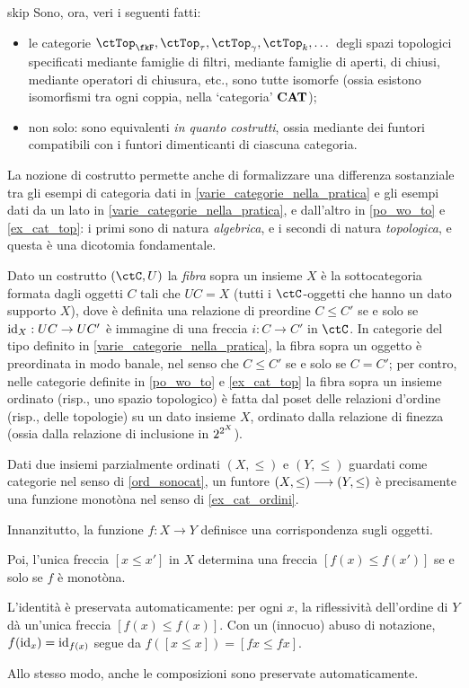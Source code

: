 \begin{hDigression}{skip}
	Sono, ora, veri i seguenti fatti:
	\begin{itemize}
		\item le categorie \(\ctTop_\fkF,\ctTop_\tau,\ctTop_\gamma,\ctTop_k,\dots\) degli spazi topologici specificati mediante famiglie di filtri, mediante famiglie di aperti, di chiusi, mediante operatori di chiusura, etc., sono tutte isomorfe (ossia esistono isomorfismi tra ogni coppia, nella `categoria' \(\mathbf{CAT}\));
		\item non solo: sono equivalenti \emph{in quanto costrutti}, ossia mediante dei funtori compatibili con i funtori dimenticanti di ciascuna categoria.
	\end{itemize}
	La nozione di costrutto permette anche di formalizzare una differenza sostanziale tra gli esempi di categoria dati in \ref{varie_categorie_nella_pratica} e gli esempi dati da un lato in \ref{varie_categorie_nella_pratica}, e dall'altro in \ref{po_wo_to} e \ref{ex_cat_top}: i primi sono di natura \emph{algebrica}, e i secondi di natura \emph{topologica}, e questa è una dicotomia fondamentale.

	Dato un costrutto \((\ctC,U)\) la \emph{fibra} sopra un insieme \(X\) è la sottocategoria formata dagli oggetti \(C\) tali che \(UC=X\) (tutti i \(\ctC\)-oggetti che hanno un dato supporto \(X\)), dove è definita una relazione di preordine \(C\le C'\) se e solo se \(\mathrm{id}_X : UC \to UC'\) è immagine di una freccia \(i : C\to C'\) in \(\ctC\). In categorie del tipo definito in \ref{varie_categorie_nella_pratica}, la fibra sopra un oggetto è preordinata in modo banale, nel senso che \(C\le C'\) se e solo se \(C=C'\); per contro, nelle categorie definite in \ref{po_wo_to} e \ref{ex_cat_top} la fibra sopra un insieme ordinato (risp., uno spazio topologico) è fatta dal poset delle relazioni d'ordine (risp., delle topologie) su un dato insieme \(X\), ordinato dalla relazione di finezza (ossia dalla relazione di inclusione in \(2^{2^{X}}\)).
\end{hDigression}
\begin{example}\label{exa_monotone_funtori}
	Dati due insiemi parzialmente ordinati \((X,\le)\) e \((Y,\le)\) guardati come categorie nel senso di \ref{ord_sonocat}, un funtore \((X,\le)\longrightarrow(Y,\le)\) è precisamente una funzione monotòna nel senso di \ref{ex_cat_ordini}.

	Innanzitutto, la funzione \(f:X\to Y\) definisce una corrispondenza sugli oggetti.

	Poi, l'unica freccia \([x\le x']\) in \(X\) determina una freccia \([f(x)\le f(x')]\) se e solo se \(f\) è monotòna.

	L'identità è preservata automaticamente: per ogni \(x\), la riflessività dell'ordine di \(Y\) dà un'unica freccia \([f(x)\le f(x)]\). Con un (innocuo) abuso di notazione, \(f(\mathrm{id}_{x})=\mathrm{id}_{f(x)}\) segue da \(f([x\le x])=[fx\le fx]\).

	Allo stesso modo, anche le composizioni sono preservate automaticamente.
\end{example}

